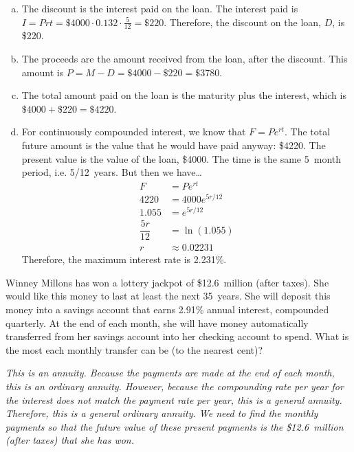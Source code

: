 \documentclass[12pt,letterpaper]{exam}
\begin{document}
\begin{questions}
{\begin{enumerate}[(a)]
\item The discount is the interest paid on the loan. The interest paid is $I= Prt= \$4000 \cdot 0.132 \cdot \frac{5}{12}= \$220$. Therefore, the discount on the loan, $D$, is \$220. \pspace

\item The proceeds are the amount received from the loan, after the discount. This amount is $P= M - D= \$4000 - \$220= \$3780$. \pspace

\item The total amount paid on the loan is the maturity plus the interest, which is $\$4000 + \$220= \$4220$. \pspace

\item For continuously compounded interest, we know that $F= Pe^{rt}$. The total future amount is the value that he would have paid anyway: \$4220. The present value is the value of the loan, \$4000. The time is the same 5~month period, i.e. 5/12~years. But then we have\dots 
	\[
	\begin{aligned}
	F&= Pe^{rt} \\[0.3cm]
	4220&= 4000 e^{5r/12} \\[0.3cm]
	1.055&= e^{5r/12} \\[0.5cm]
	\dfrac{5r}{12}&= \ln(1.055) \\[0.3cm]
	r&\approx 0.02231
	\end{aligned}
	\] \pspace
Therefore, the maximum interest rate is 2.231\%. 
\end{enumerate}
}



\newpage
\question[10] Winney Millons has won a lottery jackpot of \$12.6~million (after taxes). She would like this money to last at least the next 35~years. She will deposit this money into a savings account that earns 2.91\% annual interest, compounded quarterly. At the end of each month, she will have money automatically transferred from her savings account into her checking account to spend. What is the most each monthly transfer can be (to the nearest cent)? \pspace

{\itshape 
\sol This is an annuity. Because the payments are made at the end of each month, this is an ordinary annuity. However, because the compounding rate per year for the interest does not match the payment rate per year, this is a general annuity. Therefore, this is a general ordinary annuity. We need to find the monthly payments so that the future value of these present payments is the \$12.6~million (after taxes) that she has won. \pspace

}
\end{questions}
\end{document}
